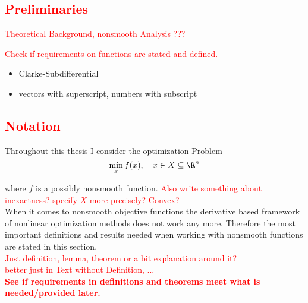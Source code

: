 \textcolor{red}{\section{Preliminaries}}

\textcolor{red}{Theoretical Background, nonsmooth Analysis ???}

\textcolor{red}{Check if requirements on functions are stated and defined.}\\

\begin{itemize}
	\item Clarke-Subdifferential
	\item vectors with superscript, numbers with subscript
\end{itemize}

\textcolor{red}{\subsection{Notation}}

Throughout this thesis I consider the optimization Problem 
\begin{equation}
\min_{x} f(x), \quad x \in X \subseteq \R^n
\label{min_prob}
\end{equation}

where \(f\) is a possibly nonsmooth function. %
\textcolor{red}{Also write something about inexactness? specify \(X\) more precisely? Convex?} \\
When it comes to nonsmooth objective functions the  derivative based framework of nonlinear optimization methods does not work any more. Therefore the most important definitions and results needed when working with nonsmooth functions are stated in this section. \\
\textcolor{red}{Just definition, lemma, theorem or a bit explanation around it?\\
better just in Text without Definition, ...} \\
\textbf{\textcolor{red}{See if requirements in definitions and theorems meet what is needed/provided later.}} \\


